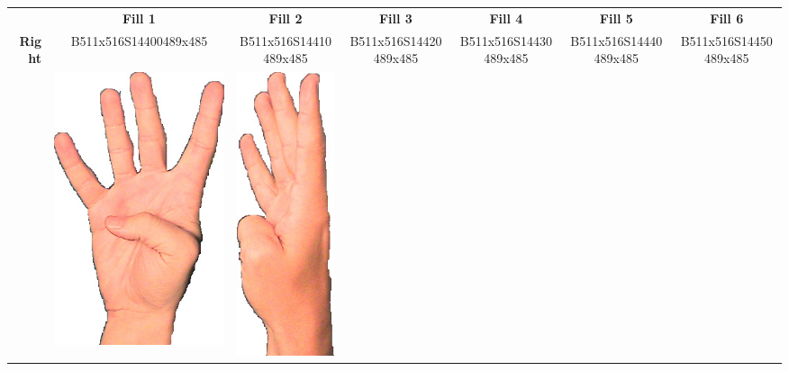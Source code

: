 \documentclass{article}
\begin{document}
\begin{center}
\begin{tabular}{r*{6}{c}}
&\textbf{Fill 1}&\textbf{Fill 2}&\textbf{Fill 3}&\textbf{Fill 4}&\textbf{Fill 5}&\textbf{Fill 6}\\
\multirow{2}{*}{\textbf{Right}}&
B511x516S14400489x485&
B511x516S14410489x485&
B511x516S14420489x485&
B511x516S14430489x485&
B511x516S14440489x485&
B511x516S14450489x485\\
&
\includegraphics[scale=0.1]{images/04-01-1.jpg}&
\includegraphics[scale=0.1]{images/04-01-2.jpg}&

\end{tabular}
\end{center}
\end{document}
